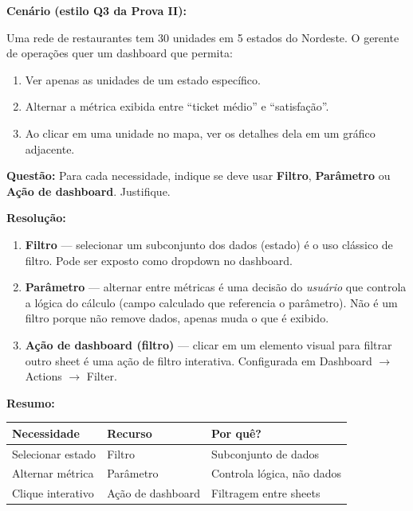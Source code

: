 \begin{SolvedBox}
\textbf{Cenário (estilo Q3 da Prova II):}

Uma rede de restaurantes tem 30 unidades em 5 estados do Nordeste.
O gerente de operações quer um dashboard que permita:
\begin{enumerate}
  \item Ver apenas as unidades de um estado específico.
  \item Alternar a métrica exibida entre ``ticket médio'' e ``satisfação''.
  \item Ao clicar em uma unidade no mapa, ver os detalhes dela em um
  gráfico adjacente.
\end{enumerate}

\textbf{Questão:} Para cada necessidade, indique se deve usar
\textbf{Filtro}, \textbf{Parâmetro} ou \textbf{Ação de dashboard}.
Justifique.

\textbf{Resolução:}
\begin{enumerate}
  \item \textbf{Filtro} — selecionar um subconjunto dos dados (estado)
  é o uso clássico de filtro. Pode ser exposto como dropdown no dashboard.
  \item \textbf{Parâmetro} — alternar entre métricas é uma decisão do
  \emph{usuário} que controla a lógica do cálculo (campo calculado que
  referencia o parâmetro). Não é um filtro porque não remove dados,
  apenas muda o que é exibido.
  \item \textbf{Ação de dashboard (filtro)} — clicar em um elemento
  visual para filtrar outro sheet é uma ação de filtro interativa.
  Configurada em Dashboard $\to$ Actions $\to$ Filter.
\end{enumerate}

\textbf{Resumo:}
\begin{center}
\begin{tabular}{|l|l|l|}
\hline
\textbf{Necessidade} & \textbf{Recurso} & \textbf{Por quê?} \\
\hline
Selecionar estado & Filtro & Subconjunto de dados \\
Alternar métrica & Parâmetro & Controla lógica, não dados \\
Clique interativo & Ação de dashboard & Filtragem entre sheets \\
\hline
\end{tabular}
\end{center}
\end{SolvedBox}

